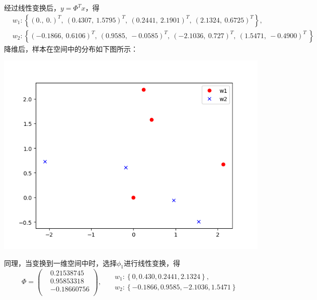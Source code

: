 \documentclass[a4paper, UTF8, 12pt]{ctexart}
\begin{document}
    经过线性变换后，$y=\Phi^Tx$，得
    \begin{equation*}
        \begin{aligned}
            &w_1:\left\{
                    (0. ,\    0.)^T, \ 
                    ( 0.4307  ,\   1.5795)^T, \ 
                    (0.2441  ,\  2.1901)^T, \ 
                    (2.1324 ,\   0.6725)^T
                    \right\}, \\
            &w_2:\left\{ 
                    (-0.1866 ,\   0.6106)^T, \ 
                    (0.9585  ,\ -0.0585)^T, \ 
                    (-2.1036 ,\   0.727)^T, \ 
                    (1.5471  ,\ -0.4900)^T \ 
                    \right\}
        \end{aligned}
    \end{equation*}
    降维后，样本在空间中的分布如下图所示：
    \begin{center}
        \includegraphics[scale=0.8]{asw2_1.png}
    \end{center}
    同理，当变换到一维空间中时，选择$\phi_1$进行线性变换，得
    \begin{equation*}
        \Phi =\left(
        \begin{aligned}
            &0.21538745 \\
            &0.95853318 \\
            &-0.18660756 \\
        \end{aligned}\right),\ \ \ 
        \begin{aligned}
            &w_1:\left\{
                0, 0.430,   0.2441,  2.1324
                    \right\}, \\
            &w_2:\left\{ 
                -0.1866, 0.9585, -2.1036,  1.5471
                    \right\}
        \end{aligned}
    \end{equation*}
\end{document}
